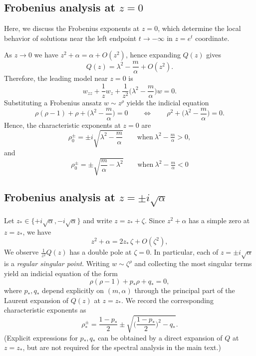 \documentclass[11pt]{article}
\theoremstyle{definition}
\numberwithin{equation}{section}
\begin{document}
\subsection{Frobenius analysis at \(z=0\)}\label{app:heun-frob-0}
Here, we discuss the Frobenius exponents at $z=0$, which determine the local behavior of solutions
near the left endpoint $t\to -\infty$ in $z=e^{t}$ coordinate.

As \(z\to 0\) we have \(z^{2}+\alpha=\alpha+O(z^{2})\), hence expanding \(Q(z)\) gives
\begin{equation}
Q(z)=\lambda^{2}- \frac{m}{\alpha}+O(z^{2}).
\end{equation}
Therefore, the leading model near \(z=0\) is
\begin{equation}
w_{zz}+\frac{1}{z}w_{z}+\frac{1}{z^{2}}\Big(\lambda^{2} - \frac{m}{\alpha}\Big)w=0.
\end{equation}
Substituting a Frobenius ansatz \(w\sim z^{\rho}\) yields the indicial equation
\begin{equation}
\rho(\rho-1)+\rho+\Big(\lambda^{2} - \frac{m}{\alpha}\Big)=0
\qquad\Longleftrightarrow\qquad 
\rho^{2}+\Big(\lambda^{2}- \frac{m}{\alpha}\Big)=0.
\end{equation}
Hence, the characteristic exponents at \(z=0\) are
\begin{equation}
\rho_{0}^{\pm}=\pm i\sqrt{\lambda^{2}- \frac{m}{\alpha}}
\qquad \text{when} \ \lambda^{2}- \tfrac{m}{\alpha}>0,
\end{equation}
and 
\begin{equation}
\rho_{0}^{\pm}=\pm \sqrt{\frac{m}{\alpha} - \lambda^{2}} \qquad \text{when} \ \lambda^{2}- \tfrac{m}{\alpha}<0
\end{equation}

\subsection{Frobenius analysis at \(z=\pm i\sqrt{\alpha}\)}\label{app:heun-frob-pm}
Let \(z_{\ast}\in\{+i\sqrt{\alpha},-i\sqrt{\alpha}\}\) and write \(z=z_{\ast}+\zeta\). Since \(z^{2}+\alpha\) has a
simple zero at \(z=z_{\ast}\), we have
\begin{equation}
z^{2}+\alpha = 2z_{\ast}\,\zeta + O(\zeta^{2}),
\end{equation}
We observe \(\frac{1}{z^{2}}Q(z)\) has a double pole at \(\zeta=0\). In particular, each of
\(z=\pm i\sqrt{\alpha}\) is a \emph{regular singular point}. Writing \(w\sim \zeta^{\rho}\) and collecting the most
singular terms yield an indicial equation of the form
\begin{equation}
\rho(\rho-1)+p_{\ast}\rho+q_{\ast}=0,
\end{equation}
where \(p_{\ast},q_{\ast}\) depend explicitly on \((m,\alpha)\) through the principal part of the Laurent expansion of
\(Q(z)\) at \(z=z_{\ast}\). We record the corresponding characteristic exponents as
\begin{equation}
\rho_{\ast}^{\pm}=\frac{1-p_{\ast}}{2}\pm\sqrt{\Big(\frac{1-p_{\ast}}{2}\Big)^{2}-q_{\ast}}.
\end{equation}
(Explicit expressions for \(p_{\ast},q_{\ast}\) can be obtained by a direct expansion of \(Q\) at
\(z=z_{\ast}\), but are not required for the spectral analysis in the main text.)
\end{document}
